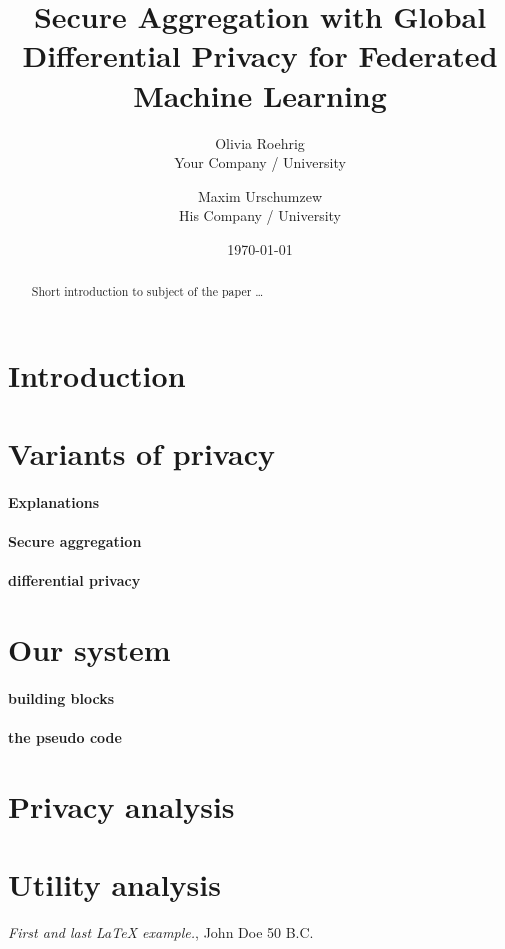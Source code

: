 \documentclass{article}
\title{Secure Aggregation with Global Differential Privacy for Federated Machine Learning}
\author{Olivia Roehrig  \\
	Your Company / University  \\
	\and
	Maxim Urschumzew \\
	His Company / University \\
	}
\date{\today}
\begin{document}
\maketitle


\begin{abstract}
Short introduction to subject of the paper \ldots 
\end{abstract}

\section{Introduction}

\section{Variants of privacy}

\paragraph{Explanations}

\paragraph{Secure aggregation}

\paragraph{differential privacy}

\section{Our system}

\paragraph{building blocks}

\paragraph{the pseudo code}

\section{Privacy analysis}


\section{Utility analysis}



\begin{thebibliography}{9}
 \emph{First and last \LaTeX{} example.},
John Doe 50 B.C.
\end{thebibliography}
\end{document}
